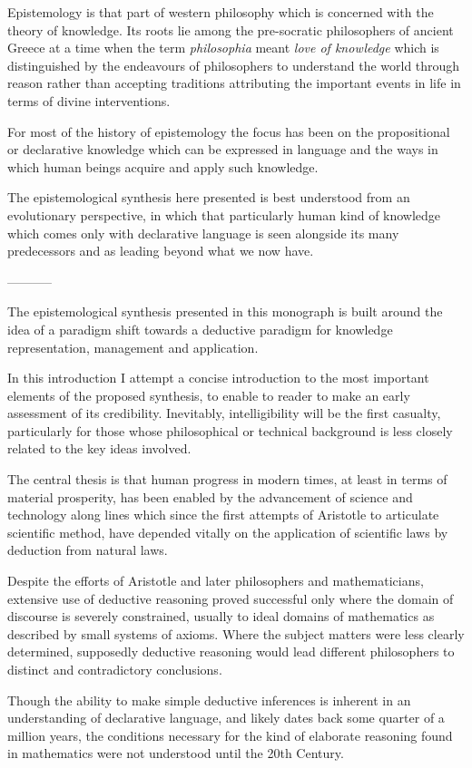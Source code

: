 \documentclass[10pt,titlepage]{book}
\begin{document}
Epistemology is that part of western philosophy which is concerned with the theory of knowledge.
Its roots lie among the pre-socratic philosophers of ancient Greece at a time when the term \emph{philosophia} meant \emph{love of knowledge} which is distinguished by the endeavours of philosophers to understand the world through reason rather than accepting traditions attributing the important events in life in terms of divine interventions.

For most of the history of epistemology the focus has been on the propositional or declarative knowledge which can be expressed in language and the ways in which human beings acquire and apply such knowledge.


The epistemological synthesis here presented is best understood from an evolutionary perspective, in which that particularly human kind of knowledge which comes only with declarative language is seen alongside its many predecessors and as leading beyond what we now have.

-----------

The epistemological synthesis presented in this monograph is built around the idea of a paradigm shift towards a deductive paradigm for knowledge representation, management and application.

In this introduction I attempt a concise introduction to the most important elements of the proposed synthesis, to enable to reader to make an early assessment of its credibility.
Inevitably, intelligibility will be the first casualty, particularly for those whose philosophical or technical background is less closely related to the key ideas involved.

The central thesis is that human progress in modern times, at least in terms of material prosperity, has been enabled by the advancement of science and technology along lines which since the first attempts of Aristotle to articulate scientific method, have depended vitally on the application of scientific laws by deduction from natural laws.

Despite the efforts of Aristotle and later philosophers and mathematicians, extensive use of deductive reasoning proved successful only where the domain of discourse is severely constrained, usually to ideal domains of mathematics as described by small systems of axioms.
Where the subject matters were less clearly determined, supposedly deductive reasoning would lead different philosophers to distinct and contradictory conclusions.

Though the ability to make simple deductive inferences is inherent in an understanding of declarative language, and likely dates back some quarter of a million years, the conditions necessary for the kind of elaborate reasoning found in mathematics were not understood until the 20th Century.
\end{document}

